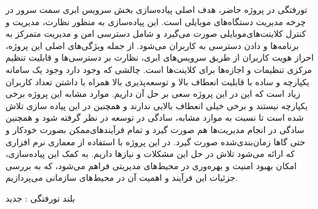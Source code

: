 


‌تورفتگی
در پروژه حاضر، هدف اصلی پیاده‌سازی بخش سرویس ابری سمت سرور در چرخه مدیریت دستگاه‌های موبایلی  است. این پیاده‌سازی به منظور نظارت، مدیریت و کنترل کلاینت‌های‌موبایلی صورت می‌گیرد و شامل دسترسی امن و مدیریت متمرکز به برنامه‌ها و دادن دسترسی به کاربران می‌شود. از جمله ویژگی‌های اصلی این پروژه، احراز هویت کاربران از طریق سرویس‌های ابری، نظارت بر دسترسی‌ها و قابلیت تنظیم مرکزی تنظیمات و اجازه‌ها برای کلاینت‌ها است. چالشی که وجود دارد وجود یک سامانه یکپارچه و ساده با قابلیت انعطاف بالا و توسعه‌پذیری بالا همراه با داشتن تعداد کاربران زیاد است که این در این پروژه سعی بر حل آن داریم. موارد مشابه این پروژه برخی یکپارچه نیستند و برخی خیلی انعطاف بالایی ندارند و همچنین در این پیاده سازی تلاش شده است تا نسبت به موارد مشابه، سادگی در توسعه در نظر گرفته شود و همچنین سادگی در انجام مدیریت‌ها هم صورت گیرد و تمام فرآیندهای‌ممکن بصورت خودکار و حتی گاها زمان‌بندی‌شده صورت گیرد. در این پروژه با استفاده از معماری نرم افزاری که ارائه می‌شود تلاش در حل این مشکلات و نیازها داریم. به کمک این پیاده‌سازی، امکان بهبود امنیت و بهره‌وری در محیط‌های مدیریتی فراهم می‌شود، که به بررسی جزئیات این فرآیند و اهمیت آن در محیط‌های سازمانی می‌پردازیم.

‌بلند
‌تورفتگی : 
‌جدید
